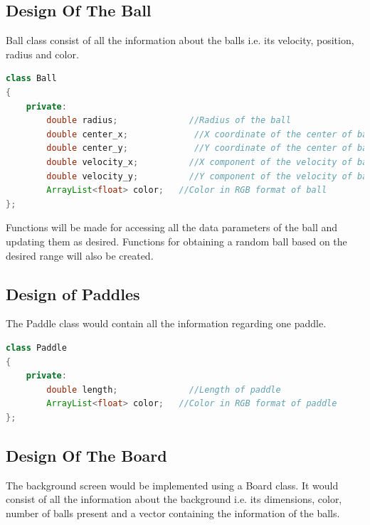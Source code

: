 \documentclass{article}
\begin{document}
\subsection{Design Of The Ball} Ball class consist of all the information about the balls i.e. its velocity, position, radius and color.


\begin{lstlisting}[language=Java, caption={Class Parameters for Ball}]
class Ball
{
	private:
		double radius;              //Radius of the ball
		double center_x;             //X coordinate of the center of ball
		double center_y;             //Y coordinate of the center of ball
		double velocity_x;          //X component of the velocity of ball
		double velocity_y;          //Y component of the velocity of ball
		ArrayList<float> color;   //Color in RGB format of ball
};

\end{lstlisting}

Functions will be made for accessing all the data parameters of the ball and updating them as desired. Functions for obtaining a random ball based on the desired range will also be created.

\subsection{Design of Paddles} The Paddle class would contain all the information regarding one paddle.

\begin{lstlisting}[language=Java, caption={Class Parameters for Paddle}]
class Paddle
{
	private:
		double length;              //Length of paddle
		ArrayList<float> color;   //Color in RGB format of paddle
};

\end{lstlisting}

\subsection{Design Of The Board} The background screen would be implemented using a Board class. It would consist of all the information about the background i.e. its dimensions, color, number of balls present and a vector containing the information of the balls.
\end{document}
